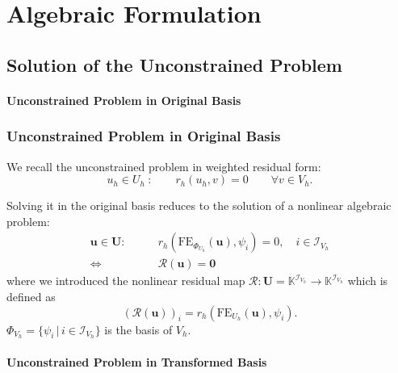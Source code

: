 \section{Algebraic Formulation}

\subsection{Solution of the Unconstrained Problem}

\paragraph{Unconstrained Problem in Original Basis}

\begin{frame}
\frametitle<presentation>{Unconstrained Problem in Original Basis}
We recall the unconstrained problem in weighted residual form:
\begin{equation}
u_h\in U_h\ : \qquad r_h(u_h,v) = 0 \qquad \forall
v\in V_h .
\end{equation}

Solving it in the original basis
reduces to the solution of a nonlinear algebraic problem:
\begin{equation}
\begin{split}
\mathbf{u}\in\mathbf{U} : \qquad
& r_h\left(\text{FE}_{\Phi_{U_h}}(\mathbf{u}),\psi_i\right) = 0, \quad
i\in\mathcal{I}_{V_h} \\
\Leftrightarrow \  & \mathcal{R}(\mathbf{u}) = \mathbf{0}
\end{split}
\end{equation}
where we introduced the nonlinear residual map $\mathcal{R} :
\mathbf{U} = \mathbb{K}^{\mathcal{I}_{V_h}} \to \mathbb{K}^{\mathcal{I}_{V_h}}$ which is defined as
\begin{equation}
\left(
\mathcal{R}(\mathbf{u})\right)_i =
r_h(\text{FE}_{U_h}(\mathbf{u}),\psi_i).
\end{equation}
$\Phi_{V_h} = \{\psi_i\,|\, i\in\mathcal{I}_{V_h}\}$ is the basis of $V_h$.
\end{frame}

\paragraph{Unconstrained Problem in Transformed Basis}

